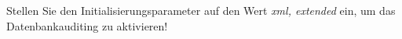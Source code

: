     \item Stellen Sie den Initialisierungsparameter  auf den Wert \textit{xml, extended} ein, um das Datenbankauditing zu aktivieren!
